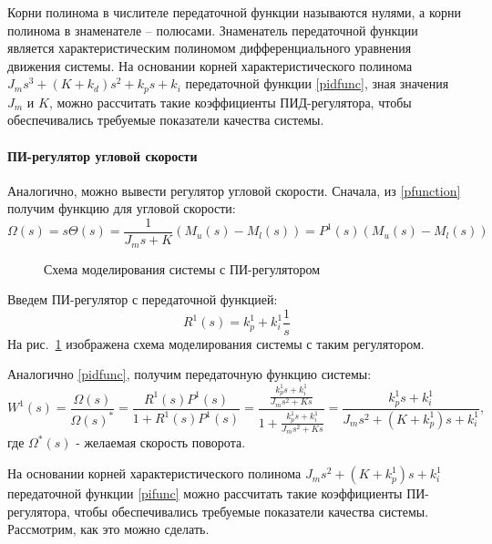 Корни полинома в числителе передаточной функции называются нулями, а корни полинома в знаменателе – полюсами. Знаменатель передаточной функции является характеристическим полиномом дифференциального уравнения движения системы. На основании корней характеристического полинома $J_ms^3+(K+k_d)s^2+k_ps+k_i$ передаточной функции \eqref{pidfunc}, зная значения $J_m$ и $K$,  можно рассчитать такие коэффициенты ПИД-регулятора, чтобы обеспечивались требуемые показатели качества системы. 

\paragraph*{ПИ-регулятор угловой скорости\\}
\hspace*{\parindent}Аналогично, можно вывести регулятор угловой скорости. Сначала, из \eqref{pfunction} получим функцию для угловой скорости:
\begin{equation}
	\Omega(s)=s\Theta(s)=\frac{1}{J_ms+K}(M_u(s)-M_l(s))=P^1(s)(M_u(s)-M_l(s))
\end{equation}

\begin{figure}[h]
	\noindent{}
	\caption{Схема моделирования системы с ПИ-регулятором}
	\label{pi}
\end{figure}

Введем ПИ-регулятор с передаточной функцией:
\begin{equation}
	R^1(s)=k_p^1+k_i^1\frac{1}{s}
\end{equation}
На рис.~\ref{pi} изображена схема моделирования системы с таким регулятором.

Аналогично \eqref{pidfunc}, получим передаточную функцию системы:
\begin{equation}\label{pifunc}
	W^1(s)=\frac{\Omega(s)}{\Omega(s)^*}=\frac{R^1(s)P^1(s)}{1+R^1(s)P^1(s)}=\frac{\frac{k_p^1s+k_i^1}{J_ms^2+Ks}}{1+\frac{k_p^1s+k_i^1}{J_ms^2+Ks}}=\frac{k_p^1s+k_i^1}{J_ms^2+(K+k_p^1)s+k_i^1},
\end{equation}
где $\Omega^*(s)$ - желаемая скорость поворота.

На основании корней характеристического полинома $J_ms^2+(K+k_p^1)s+k_i^1$ передаточной функции \eqref{pifunc} можно рассчитать такие коэффициенты ПИ-регулятора, чтобы обеспечивались требуемые показатели качества системы. Рассмотрим, как это можно сделать. 